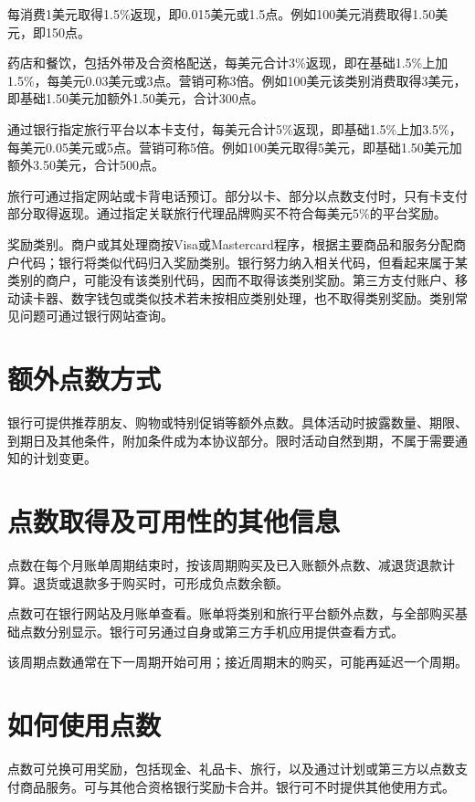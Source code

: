 \documentclass[UTF8,fontset=none,11pt,a4paper]{ctexart}
\begin{document}
每消费1美元取得1.5\%返现，即0.015美元或1.5点。例如100美元消费取得1.50美元，即\allowbreak\mbox{150点。}


药店和餐饮，包括外带及合资格配送，每美元合计3\%返现，即在基础1.5\%上加1.5\%，每美元0.03美元或3点。营销可称3倍。例如100美元该类别消费取得3美元，即基础1.50美元加额外1.50美元，合计300点。


通过银行指定旅行平台以本卡支付，每美元合计5\%返现，即基础1.5\%上加3.5\%，每美元0.05美元或5点。营销可称5倍。例如100美元取得5美元，即基础1.50美元加额外3.50美元，合计\allowbreak\mbox{500点。}


旅行可通过指定网站或卡背电话预订。部分以卡、部分以点数支付时，只有卡支付部分取得返现。通过指定关联旅行代理品牌购买不符合每美元5\%的\allowbreak\mbox{平台奖励。}


奖励类别。商户或其处理商按Visa或Mastercard程序，根据主要商品和服务分配商户代码；银行将类似代码归入奖励类别。银行努力纳入相关代码，但看起来属于某类别的商户，可能没有该类别代码，因而不取得该类别奖励。第三方支付账户、移动读卡器、数字钱包或类似技术若未按相应类别处理，也不取得类别奖励。类别常见问题可通过银行\allowbreak\mbox{网站查询。}


\section*{额外点数方式}
银行可提供推荐朋友、购物或特别促销等额外点数。具体活动时披露数量、期限、到期日及其他条件，附加条件成为本协议部分。限时活动自然到期，不属于需要通知的\allowbreak\mbox{计划变更。}


\section*{点数取得及可用性的其他信息}
点数在每个月账单周期结束时，按该周期购买及已入账额外点数、减退货退款计算。退货或退款多于购买时，可形成负\allowbreak\mbox{点数余额。}


点数可在银行网站及月账单查看。账单将类别和旅行平台额外点数，与全部购买基础点数分别显示。银行可另通过自身或第三方手机应用提供\allowbreak\mbox{查看方式。}


该周期点数通常在下一周期开始可用；接近周期末的购买，可能再延迟\allowbreak\mbox{一个周期。}


\section*{如何使用点数}
点数可兑换可用奖励，包括现金、礼品卡、旅行，以及通过计划或第三方以点数支付商品服务。可与其他合资格银行奖励卡合并。银行可不时提供其他\allowbreak\mbox{使用方式。}
\end{document}
